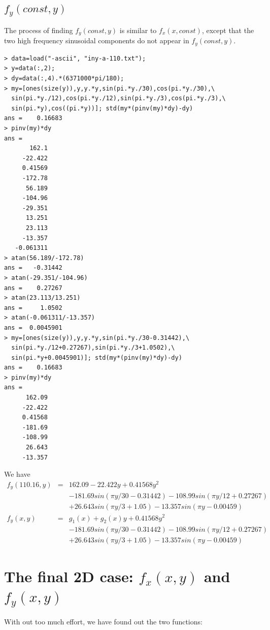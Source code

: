 \documentclass[a4paper]{article}
\begin{document}
\subsection{$f_y(const, y)$}

The process of finding $f_y(const, y)$ is similar to $f_x(x, const)$, except
that the two high frequency sinusoidal components do not appear in $f_y(const,
y)$.
\begin{verbatim}
> data=load("-ascii", "iny-a-110.txt");
> y=data(:,2);
> dy=data(:,4).*(6371000*pi/180);
> my=[ones(size(y)),y,y.*y,sin(pi.*y./30),cos(pi.*y./30),\
  sin(pi.*y./12),cos(pi.*y./12),sin(pi.*y./3),cos(pi.*y./3),\
  sin(pi.*y),cos((pi.*y))]; std(my*(pinv(my)*dy)-dy)
ans =    0.16683
> pinv(my)*dy
ans =
       162.1
     -22.422
     0.41569
     -172.78
      56.189
     -104.96
     -29.351
      13.251
      23.113
     -13.357
   -0.061311
> atan(56.189/-172.78)
ans =   -0.31442
> atan(-29.351/-104.96)
ans =    0.27267
> atan(23.113/13.251)
ans =     1.0502
> atan(-0.061311/-13.357)
ans =  0.0045901
> my=[ones(size(y)),y,y.*y,sin(pi.*y./30-0.31442),\
  sin(pi.*y./12+0.27267),sin(pi.*y./3+1.0502),\
  sin(pi.*y+0.0045901)]; std(my*(pinv(my)*dy)-dy)
ans =    0.16683
> pinv(my)*dy
ans =
      162.09
     -22.422
     0.41568
     -181.69
     -108.99
      26.643
     -13.357
\end{verbatim}

We have
\begin{eqnarray}
f_y(110.16,y) &=& 162.09-22.422y+0.41568y^2 \nonumber \\
              & & -181.69sin(\pi y/30-0.31442)-108.99sin(\pi y/12+0.27267) \nonumber \\
              & & +26.643sin(\pi y/3+1.05)-13.357sin(\pi y-0.00459) \\
f_y(x,y)      &=& g_1(x)+g_2(x)y+0.41568y^2 \nonumber \\
              & & -181.69sin(\pi y/30-0.31442)-108.99sin(\pi y/12+0.27267) \nonumber \\
              & & +26.643sin(\pi y/3+1.05)-13.357sin(\pi y-0.00459)
\end{eqnarray}

\section{The final 2D case: $f_x(x,y)$ and $f_y(x,y)$}
With out too much effort, we have found out the two functions:
\end{document}
